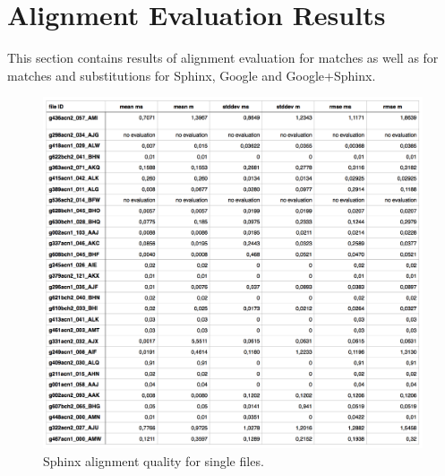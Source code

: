 \chapter{Alignment Evaluation Results }
This section contains results of alignment evaluation for matches as well 
as for matches and substitutions for Sphinx, Google and Google+Sphinx. 
\label{chap:appC}

\begin{figure}[htbp]
  \centering
    \includegraphics[width=1.0\textwidth]{images/sphinxtable.png}
 \caption{ Sphinx alignment quality for single files.  }
\end {figure}

